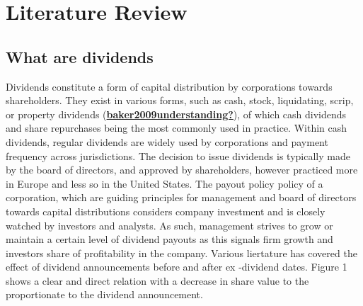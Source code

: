 \documentclass[12pt,preprint, authoryear]{elsarticle}
\numberwithin{equation}{section}
\numberwithin{figure}{section}
\numberwithin{table}{section}
\begin{document}
\hypertarget{literature-review}{%
\section{\texorpdfstring{Literature Review
\label{Literature Review}}{Literature Review }}\label{literature-review}}

\hypertarget{what-are-dividends}{%
\subsection{What are dividends}\label{what-are-dividends}}

Dividends constitute a form of capital distribution by corporations
towards shareholders. They exist in various forms, such as cash, stock,
liquidating, scrip, or property dividends
(\protect\hyperlink{ref-baker2009understanding}{\textbf{baker2009understanding?}}),
of which cash dividends and share repurchases being the most commonly
used in practice. Within cash dividends, regular dividends are widely
used by corporations and payment frequency across jurisdictions. The
decision to issue dividends is typically made by the board of directors,
and approved by shareholders, however practiced more in Europe and less
so in the United States. The payout policy policy of a corporation,
which are guiding principles for management and board of directors
towards capital distributions considers company investment and is
closely watched by investors and analysts. As such, management strives
to grow or maintain a certain level of dividend payouts as this signals
firm growth and investors share of profitability in the company. Various
liertature has covered the effect of dividend announcements before and
after ex -dividend dates. Figure 1 shows a clear and direct relation
with a decrease in share value to the proportionate to the dividend
announcement.
\end{document}
